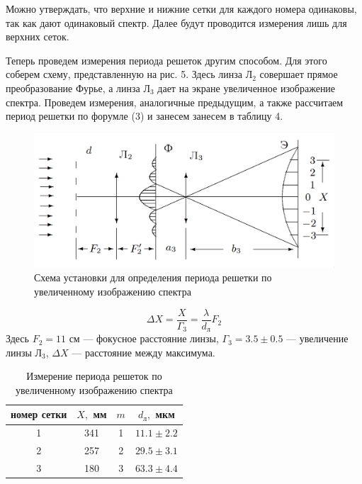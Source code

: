 \documentclass[a4paper,12pt]{article}
\begin{document}
\noindent
Можно утверждать, что верхние и нижние сетки для каждого номера одинаковы, так как дают одинаковый спектр. Далее будут проводится измерения лишь для верхних сеток. 

\noindent
Теперь проведем измерения периода решеток другим способом. Для этого соберем схему, представленную на рис. 5. Здесь линза Л$_2$ совершает прямое преобразование Фурье, а линза Л$_3$ дает на экране увеличенное изображение спектра. Проведем измерения, аналогичные предыдущим, а также рассчитаем период решетки по форумле (3) и занесем занесем в таблицу 4.

\begin{figure}[H]
    \centering
    \includegraphics[scale=0.30]{image_3_.png}
    \caption{Схема установки для определения периода решетки по увеличенному изображению спектра}
\end{figure}

\begin{equation}
    \Delta X = \frac{X}{\Gamma_3} = \frac{\lambda}{d_\text{л}} F_2
\end{equation}
\noindent
Здесь $F_2 = 11$ см --- фокусное расстояние линзы, $\Gamma_3 = 3.5 \pm 0.5$ --- увеличение линзы Л$_3$, $\Delta X$ --- расстояние между максимума.

\begin{table}[H]
    \centering
    \caption{Измерение периода решеток по увеличенному изображению спектра}
    \begin{tabular}{|c|c|c|c|} \hline
        номер сетки & $X,$ мм & $m$ & $d_\text{л},$ мкм \\ \hline
        1 & 341 & 1 & $11.1 \pm 2.2$ \\ \hline
        2 & 257 & 2 & $29.5 \pm 3.1$ \\ \hline
        3 & 180 & 3 & $63.3 \pm 4.4$ \\ \hline
    \end{tabular}
\end{table}
\end{document}

